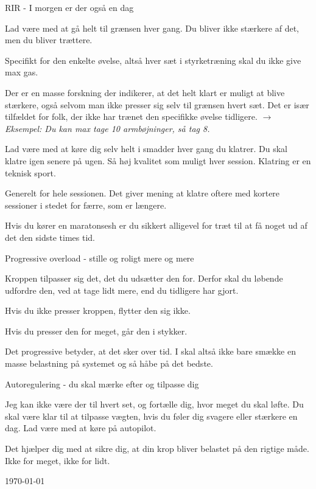 \begin{multicols}{2}
  \begin{tList}{RIR - I morgen er der også en dag}

  \item Lad være med at gå helt til grænsen hver gang. Du bliver ikke
    stærkere af det, men du bliver trættere.

  \item Specifikt for den enkelte øvelse, altså hver sæt i
    styrketræning skal du ikke give max gas.
  \item Der er en masse forskning der indikerer, at det helt klart er
    muligt at blive stærkere, også selvom man ikke presser sig selv
    til grænsen hvert sæt. Det er især tilfældet for folk, der ikke
    har trænet den specifikke øvelse tidligere.
    \emph{$\rightarrow$ Eksempel: Du kan max tage 10 armbøjninger, så tag 8.}

  \item Lad være med at køre dig selv helt i smadder hver gang du
    klatrer. Du skal klatre igen senere på ugen. Så høj kvalitet som
    muligt hver session. Klatring er en teknisk sport.

  \item Generelt for hele sessionen. Det giver mening at klatre
    oftere med kortere sessioner i stedet for færre, som er længere.

  \item Hvis du kører en maratonsesh er du sikkert alligevel for træt
    til at få noget ud af det den sidste times tid.
  \end{tList}

  \begin{tList}{Progressive overload - stille og roligt mere og mere}
  \item Kroppen tilpasser sig det, det du udsætter den for. Derfor
    skal du løbende udfordre den, ved at tage lidt mere, end du
    tidligere har gjort.
  \item Hvis du ikke presser kroppen, flytter den sig ikke.
  \item Hvis du presser den for meget, går den i stykker.
  \item Det progressive betyder, at det sker over tid. I skal altså
    ikke bare smække en masse belastning på systemet og så håbe på det bedste.
  \end{tList}

  \begin{tList}{Autoregulering - du skal mærke efter og tilpasse dig}
  \item Jeg kan ikke være der til hvert set, og fortælle dig, hvor
    meget du skal løfte. Du skal være klar til at tilpasse vægten,
    hvis du føler dig svagere eller stærkere en dag. Lad være med at
    køre på autopilot.
  \item Det hjælper dig med at sikre dig, \hspace{.5em}
  at din krop bliver belastet
    på den rigtige måde. Ikke for meget, ikke for lidt.
  
        \hfill {\today}\end{tList}
\end{multicols}
